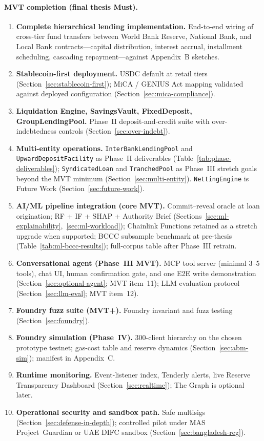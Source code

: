 \documentclass[12pt,a4paper]{report}
\begin{document}
\paragraph{MVT completion (final thesis Must).}
\begin{enumerate}[noitemsep]
\item \textbf{Complete hierarchical lending implementation.} End-to-end wiring of cross-tier fund transfers between World Bank Reserve, National Bank, and Local Bank contracts---capital distribution, interest accrual, installment scheduling, cascading repayment---against Appendix~B sketches.
\item \textbf{Stablecoin-first deployment.} USDC default at retail tiers (Section~\ref{sec:stablecoin-first}); MiCA / GENIUS Act mapping validated against deployed configuration (Section~\ref{sec:mica-compliance}).
\item \textbf{Liquidation Engine, SavingsVault, FixedDeposit, GroupLendingPool.} Phase~II deposit-and-credit suite with over-indebtedness controls (Section~\ref{sec:over-indebt}).
\item \textbf{Multi-entity operations.} \texttt{InterBankLendingPool} and \texttt{UpwardDepositFacility} as Phase~II deliverables (Table~\ref{tab:phase-deliverables}); \texttt{SyndicatedLoan} and \texttt{TranchedPool} as Phase~III stretch goals beyond the MVT minimum (Section~\ref{sec:multi-entity}). \texttt{NettingEngine} is Future Work (Section~\ref{sec:future-work}).
\item \textbf{AI/ML pipeline integration (core MVT).} Commit--reveal oracle at loan origination; RF + IF + SHAP + Authority Brief (Sections~\ref{sec:ml-explainability},~\ref{sec:ml-workload}); Chainlink Functions retained as a stretch upgrade when supported; BCCC subsample benchmark at pre-thesis (Table~\ref{tab:ml-bccc-results}); full-corpus table after Phase~III retrain.
\item \textbf{Conversational agent (Phase~III MVT).} MCP tool server (minimal 3--5 tools), chat UI, human confirmation gate, and one E2E write demonstration (Section~\ref{sec:optional-agent}; MVT item~11); LLM evaluation protocol (Section~\ref{sec:llm-eval}; MVT item~12).
\item \textbf{Foundry fuzz suite (MVT+).} Foundry invariant and fuzz testing (Section~\ref{sec:foundry}).
\item \textbf{Foundry simulation (Phase~IV).} 300-client hierarchy on the chosen prototype testnet; gas-cost table and reserve dynamics (Section~\ref{sec:abm-sim}); manifest in Appendix~C.
\item \textbf{Runtime monitoring.} Event-listener index, Tenderly alerts, live Reserve Transparency Dashboard (Section~\ref{sec:realtime}); The Graph is optional later.
\item \textbf{Operational security and sandbox path.} Safe multisigs (Section~\ref{sec:defense-in-depth}); controlled pilot under MAS Project~Guardian or UAE DIFC sandbox (Section~\ref{sec:bangladesh-reg}).
\end{enumerate}
\end{document}
